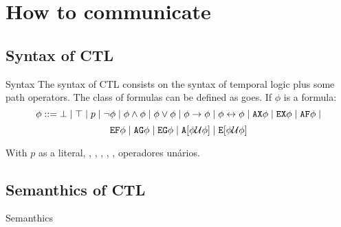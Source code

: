 \section{How to communicate}
\subsection{Syntax of CTL}
\begin{frame}{Syntax}
	The syntax of CTL consists on the syntax of temporal logic plus some path operators. The class of formulas can be defined as goes. If $\phi$ is a formula:
	$$\phi ::= \bot \; | \; \top \; | \; p \; | \; \neg \phi \; | \; \phi \land \phi \; | \; \phi \lor \phi \; | \; \phi \to \phi \; | \; \phi \leftrightarrow \phi \; | \; \texttt{AX} \phi \; | \; \texttt{EX} \phi \; | \; \texttt{AF} \phi \; |$$
	$$\texttt{EF} \phi \; | \; \texttt{AG} \phi \; | \; \texttt{EG} \phi \; | \; \texttt{A}[\phi \mathcal{U} \phi] \; | \; \texttt{E}[\phi \mathcal{U} \phi]$$
	
	With $p$ as a literal, \AX, \EX, \AF, \EF, \AG, \EG operadores unários.
	
\end{frame}
\subsection{Semanthics of CTL}
\begin{frame}{Semanthics}
	
\end{frame}